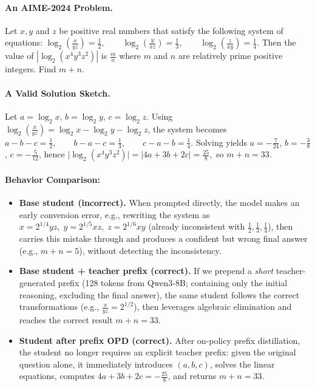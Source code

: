 \documentclass[11pt]{article}
\begin{document}
\paragraph{An AIME-2024 Problem.}  

Let $x,y$ and $z$ be positive real numbers that satisfy the following system of equations: 
$  
\log_2\!\left(\frac{x}{yz}\right)=\frac12,\qquad  
\log_2\!\left(\frac{y}{xz}\right)=\frac13,\qquad  
\log_2\!\left(\frac{z}{xy}\right)=\frac14.  
$  
Then the value of $\left|\log_2(x^4y^3z^2)\right|$ is $\tfrac{m}{n}$ where $m$ and $n$ are relatively prime positive integers. Find $m+n$.

  
\paragraph{A Valid Solution Sketch.}  
Let $a=\log_2 x$, $b=\log_2 y$, $c=\log_2 z$. Using  
$\log_2\!\left(\frac{x}{yz}\right)=\log_2x-\log_2y-\log_2z$,  
the system becomes  
$  
a-b-c=\tfrac12,\qquad b-a-c=\tfrac13,\qquad c-a-b=\tfrac14.  
$  
Solving yields $a=-\tfrac{7}{24}$, $b=-\tfrac{3}{8}$, $c=-\tfrac{5}{12}$, hence  
$  
\bigl|\log_2(x^4y^3z^2)\bigr|=\bigl|4a+3b+2c\bigr|=\tfrac{25}{8},  
$  
so $m+n=33$.  
  
\paragraph{Behavior Comparison:}  
\begin{itemize}[leftmargin=0pt, labelsep=0.6em, itemindent=1.2em, nosep, label=--]
  \item \textbf{Base student (incorrect).}  
  When prompted directly, the model makes an early conversion error, e.g., rewriting the system as  
  $  
  x=2^{1/4}yz,\;  
  y=2^{1/5}xz,\;  
  z=2^{1/6}xy  
  $  
  (already inconsistent with $\tfrac12,\tfrac13,\tfrac14$), then carries this mistake through and produces a confident but wrong final answer (e.g., $m+n=5$), without detecting the inconsistency.  
  
  \item \textbf{Base student + teacher prefix (correct).}  
  If we prepend a \emph{short} teacher-generated prefix (128 tokens from Qwen3-8B; containing only the initial reasoning, excluding the final answer), the same student follows the correct transformations  
  (e.g., $\frac{x}{yz}=2^{1/2}$), then leverages algebraic elimination and reaches the correct result $m+n=33$.  
  
  \item \textbf{Student after prefix OPD (correct).}  
  After on-policy prefix distillation, the student no longer requires an explicit teacher prefix: given the original question alone, it immediately introduces $(a,b,c)$, solves the linear equations, computes  
  $4a+3b+2c=-\tfrac{25}{8}$, and returns $m+n=33$.  
\end{itemize}  
  
\end{document}
